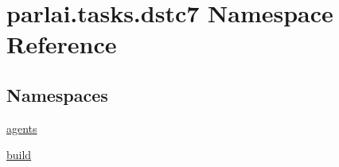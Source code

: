\hypertarget{namespaceparlai_1_1tasks_1_1dstc7}{}\section{parlai.\+tasks.\+dstc7 Namespace Reference}
\label{namespaceparlai_1_1tasks_1_1dstc7}
\subsection*{Namespaces}
\begin{DoxyCompactItemize}
\item 
 \hyperlink{namespaceparlai_1_1tasks_1_1dstc7_1_1agents}{agents}
\item 
 \hyperlink{namespaceparlai_1_1tasks_1_1dstc7_1_1build}{build}
\end{DoxyCompactItemize}
